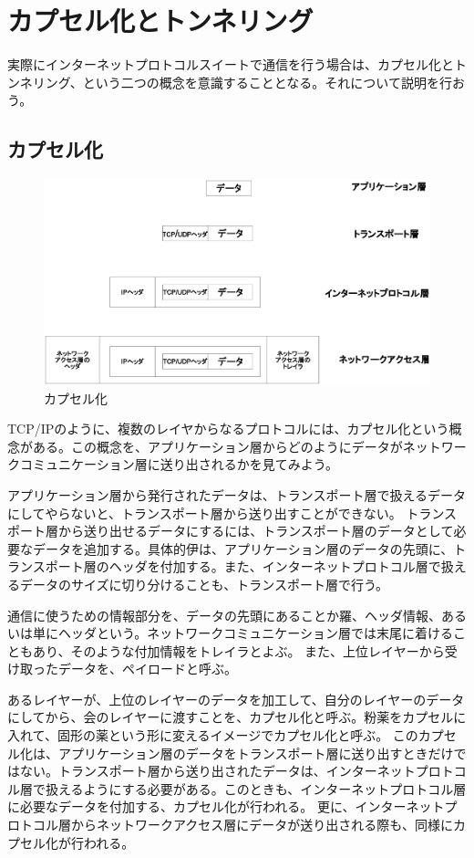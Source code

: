 \section{カプセル化とトンネリング}

実際にインターネットプロトコルスイートで通信を行う場合は、カプセル化とトンネリング、という二つの概念を意識することとなる。それについて説明を行おう。

\subsection{カプセル化}

\begin{figure}
	\includegraphics[width=12cm,clip]{draw/encupselation.eps}
	\caption{カプセル化}
	\label{fig:encupselation}
\end{figure}

TCP/IPのように、複数のレイヤからなるプロトコルには、カプセル化という概念がある。この概念を、アプリケーション層からどのようにデータがネットワークコミュニケーション層に送り出されるかを見てみよう。

アプリケーション層から発行されたデータは、トランスポート層で扱えるデータにしてやらないと、トランスポート層から送り出すことができない。
トランスポート層から送り出せるデータにするには、トランスポート層のデータとして必要なデータを追加する。具体的伊は、アプリケーション層のデータの先頭に、トランスポート層のヘッダを付加する。また、インターネットプロトコル層で扱えるデータのサイズに切り分けることも、トランスポート層で行う。

通信に使うための情報部分を、データの先頭にあることか羅、ヘッダ情報、あるいは単にヘッダという。ネットワークコミュニケーション層では末尾に着けることもあり、そのような付加情報をトレイラとよぶ。
また、上位レイヤーから受け取ったデータを、ペイロードと呼ぶ。

あるレイヤーが、上位のレイヤーのデータを加工して、自分のレイヤーのデータにしてから、会のレイヤーに渡すことを、カプセル化と呼ぶ。粉薬をカプセルに入れて、固形の薬という形に変えるイメージでカプセル化と呼ぶ。
このカプセル化は、アプリケーション層のデータをトランスポート層に送り出すときだけではない。トランスポート層から送り出されたデータは、インターネットプロトコル層で扱えるようにする必要がある。このときも、インターネットプロトコル層に必要なデータを付加する、カプセル化が行われる。
更に、インターネットプロトコル層からネットワークアクセス層にデータが送り出される際も、同様にカプセル化が行われる。

